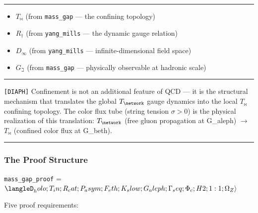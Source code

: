 \documentclass[12pt,a4paper]{article}
\begin{document}
\begin{center}
\rule{0.5\textwidth}{0.4pt}
\end{center}

\begin{itemize}
    \item $T_{\bowtie}$ (from \texttt{mass\_gap} --- the confining topology)
    \item $R_{\dagger}$ (from \texttt{yang\_mills} --- the dynamic gauge relation)
    \item $D_{\infty}$ (from \texttt{yang\_mills} --- infinite-dimensional field space)
    \item $G_{\beth}$ (from \texttt{mass\_gap} --- physically observable at hadronic scale)
\end{itemize}

\begin{center}
\rule{0.5\textwidth}{0.4pt}
\end{center}

\texttt{{[}DIAPH{]}} Confinement is not an additional feature of QCD --- it is the structural mechanism that translates the global $T_{\network}$ gauge dynamics into the local $T_{\bowtie}$ confining topology. The color flux tube (string tension $\sigma > 0$) is the physical realization of this translation: $T_{\network}$ (free gluon propagation at G\_aleph) $\to$ $T_{\bowtie}$ (confined color flux at G\_beth).

\begin{center}
\rule{0.5\textwidth}{0.4pt}
\end{center}

\subsubsection{The Proof Structure}

\texttt{mass\_gap\_proof} = $\langleD_holo; T_in; R_cat; P_asym; F_eth; K_slow; G_aleph; \Gamma_seq; \Phi_c; H2; {1:1}; \Omega_Z\rangle$

Five proof requirements:
\end{document}
